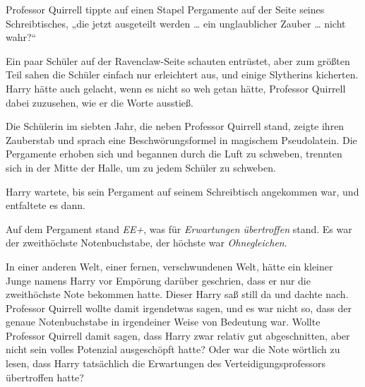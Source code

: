 Professor Quirrell tippte auf einen Stapel Pergamente auf der Seite seines Schreibtisches,
„die jetzt ausgeteilt werden … ein unglaublicher Zauber … nicht wahr?“

Ein paar Schüler auf der Ravenclaw-Seite schauten entrüstet, aber zum größten Teil sahen die Schüler einfach nur erleichtert aus, und einige Slytherins kicherten. Harry hätte auch gelacht, wenn es nicht so weh getan hätte, Professor Quirrell dabei zuzusehen, wie er die Worte ausstieß.

Die Schülerin im siebten Jahr, die neben Professor Quirrell stand, zeigte ihren Zauberstab und sprach eine Beschwörungsformel in magischem Pseudolatein. Die Pergamente erhoben sich und begannen durch die Luft zu schweben, trennten sich in der Mitte der Halle, um zu jedem Schüler zu schweben.

Harry wartete, bis sein Pergament auf seinem Schreibtisch angekommen war, und entfaltete es dann.

Auf dem Pergament stand \emph{EE+}, was für \emph{Erwartungen übertroffen} stand. Es war der zweithöchste Notenbuchstabe, der höchste war \emph{Ohnegleichen}.

In einer anderen Welt, einer fernen, verschwundenen Welt, hätte ein kleiner Junge namens Harry vor Empörung darüber geschrien, dass er nur die zweithöchste Note bekommen hatte. Dieser Harry saß still da und dachte nach. Professor Quirrell wollte damit irgendetwas sagen, und es war nicht so, dass der genaue Notenbuchstabe in irgendeiner Weise von Bedeutung war. Wollte Professor Quirrell damit sagen, dass Harry zwar relativ gut abgeschnitten, aber nicht sein volles Potenzial ausgeschöpft hatte? Oder war die Note wörtlich zu lesen, dass Harry tatsächlich die Erwartungen des Verteidigungsprofessors übertroffen hatte?

